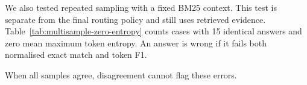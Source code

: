 \documentclass{nthu_thesis}
\begin{document}
\begin{thesiscjk}
We also tested repeated sampling with a fixed BM25 context. This test is separate from the final routing policy and still uses retrieved evidence. Table~\ref{tab:multisample-zero-entropy} counts cases with 15 identical answers and zero mean maximum token entropy. An answer is wrong if it fails both normalised exact match and token F1.

\begin{table}[h]
    \centering
    \caption[Repeated-Sampling Errors]{Repeated-sampling agreement and errors.}
    \label{tab:multisample-zero-entropy}
    \setlength{\tabcolsep}{5pt}
    \small
\end{table}

When all samples agree, disagreement cannot flag these errors.


\end{thesiscjk}
\end{document}
